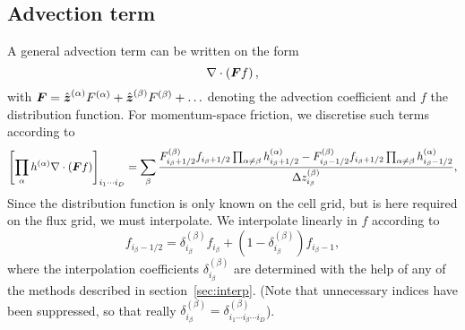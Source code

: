 \documentclass{notes}
\begin{document}
    \subsection{Advection term}
    A general advection term can be written on the form
    \begin{equation*}
        \nabla\cdot\left( \boldsymbol{F} f \right),
    \end{equation*}
    with $\boldsymbol{F} = \hat{\boldsymbol{z}}^{(\alpha)}F^{(\alpha)} + \hat{\boldsymbol{z}}^{(\beta)}F^{(\beta)}+\ldots$
    denoting the advection coefficient and $f$ the distribution function. For
    momentum-space friction, we discretise such terms according to
    \begin{equation}\label{eq:advection:discr}
        \left[\prod_\alpha h^{(\alpha)} \nabla\cdot\left( \boldsymbol{F}f \right) \right]_{i_1\cdots i_D} =
            \sum_\beta \frac{
                F^{(\beta)}_{i_\beta+1/2}f_{i_\beta+1/2}\prod_{\alpha\neq\beta} h^{(\alpha)}_{i_\beta+1/2} -
                F^{(\beta)}_{i_\beta-1/2}f_{i_\beta+1/2}\prod_{\alpha\neq\beta} h^{(\alpha)}_{i_\beta-1/2}
            }{\Delta z^{(\beta)}_{i_\beta}},
    \end{equation}
    Since the distribution function is only known on the cell grid, but is here
    required on the flux grid, we must interpolate. We interpolate linearly in
    $f$ according to
    \begin{equation}
        f_{i_\beta-1/2} = \delta^{(\beta)}_{i_\beta} f_{i_\beta} + \left( 1 - \delta^{(\beta)}_{i_\beta} \right) f_{i_\beta-1},
    \end{equation}
    where the interpolation coefficients $\delta^{(\beta)}_{i_\beta}$ are
    determined with the help of any of the methods described in
    section~\ref{sec:interp}. (Note that unnecessary indices have been
    suppressed, so that really
    $\delta^{(\beta)}_{i_\beta} = \delta^{(\beta)}_{i_1\cdots i_\beta\cdots i_D}$).
\end{document}
